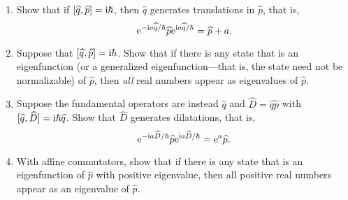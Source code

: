 \begin{enumerate}[label=(\alph*),nosep]
\item Show that if $[\widehat{q},\widehat{p}]=\mathrm{i}\hbar$, then
  $\widehat{q}$ generates translations in $\widehat{p}$, that is,
  \begin{equation*}
\mathrm{e}^{-\mathrm{i} a\widehat{q}/\hbar}\widehat{p}\mathrm{e}^{\mathrm{i} a\widehat{q}/\hbar}=\widehat{p}+a.
  \end{equation*}
\item Suppose that $[\widehat{q},\widehat{p}]=\mathrm{i}\hbar$. Show that if
  there is any state that is an eigenfunction (or a generalized
  eigenfunction---that is, the state need not be normalizable) of
  $\widehat{p}$, then \emph{all} real numbers appear as eigenvalues of $\widehat{p}$.
\item Suppose the fundamental operators are instead $\widehat{q}$ and
  $\widehat{D}=\widehat{qp}$ with
  $[\widehat{q},\widehat{D}]=\mathrm{i}\hbar\widehat{q}$. Show that
  $\widehat{D}$ generates dilatations, that is,
  \begin{equation*}
\mathrm{e}^{-\mathrm{i} a\widehat{D}/\hbar}\widehat{p}\mathrm{e}^{\mathrm{i} a\widehat{D}/\hbar}=\mathrm{e}^{a}\widehat{p}.
  \end{equation*}
\item With affine commutators, show that if there is any state that is
  an eigenfunction of $\widehat{p}$ with positive eigenvalue, then all
  positive real numbers appear as an eigenvalue of $\widehat{p}$.
\end{enumerate}
